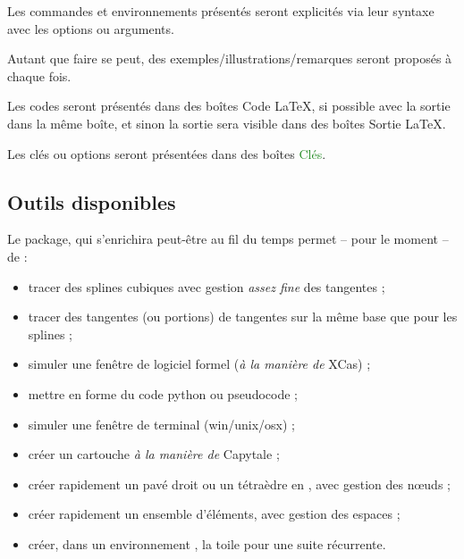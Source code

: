 \documentclass{article}
\begin{document}
\smallskip

\begin{codeinfo}
Les \textsf{commandes} et \textsf{environnements} présentés seront explicités via leur \textsf{syntaxe} avec les \textsf{options} ou \textsf{arguments}.

Autant que faire se peut, des exemples/illustrations/remarques seront proposés à chaque fois.

\smallskip

Les \textsf{codes} seront présentés dans des \textsf{boîtes} \textcolor{red!75!black}{{\small \faCode} Code \LaTeX}, si possible avec la \textsf{sortie} dans la même boîte, et sinon la \textsf{sortie} sera visible dans des \textsf{boîtes} \textcolor{red!75!black}{{\small \faArrowAltCircleRight[regular]} Sortie \LaTeX}.

Les \textsf{clés} ou \textsf{options} seront présentées dans des \textsf{boîtes} \textcolor{ForestGreen}{{\small \faPaperclip} Clés}.
\end{codeinfo}

\subsection{Outils disponibles}

\begin{codeidee}
Le {package}, qui s'enrichira peut-être au fil du temps permet -- pour le moment -- de :

\begin{itemize}
	\item tracer des splines cubiques avec gestion \textit{assez fine} des tangentes ;
	\item tracer des tangentes (ou portions) de tangentes sur la même base que pour les splines ;
	\item simuler une fenêtre de logiciel formel (\textit{à la manière de} \textsf{XCas}) ;
	\item mettre en forme du code \textsf{python} ou \textsf{pseudocode} ;
	\item simuler une fenêtre de terminal (win/unix/osx) ;
	\item créer un cartouche \textit{à la manière de} Capytale ;
	\item créer rapidement un pavé droit ou un tétraèdre en \TikZ, avec gestion des nœuds ;
	\item créer rapidement un ensemble d'éléments, avec gestion des espaces ;
	\item créer, dans un environnement \TikZ, la \og toile \fg{} pour une suite récurrente.
\end{itemize}
\end{codeidee}
\end{document}
